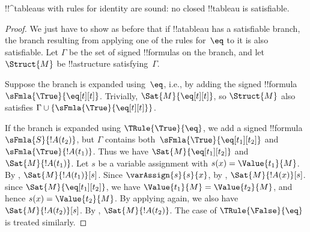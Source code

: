 \documentclass[../../../include/open-logic-section]{subfiles}
\begin{document}


\begin{prop}
!!^{tableau}s with rules for identity are sound: no closed !!{tableau}
  is satisfiable.
\end{prop}

\begin{proof}
We just have to show as before that if !!a{tableau} has a satisfiable
branch, the branch resulting from applying one of the rules for~$\eq$
to it is also satisfiable. Let $\Gamma$ be the set of signed
!!{formula}s on the branch, and let $\Struct{M}$ be !!a{structure}
satisfying~$\Gamma$.

Suppose the branch is expanded using~$\eq$, i.e., by adding the signed
!!{formula}~$\sFmla{\True}{\eq[t][t]}$. Trivially,
$\Sat{M}{\eq[t][t]}$, so $\Struct{M}$ also satisfies $\Gamma \cup
\{\sFmla{\True}{\eq[t][t]}\}$.

If the branch is expanded using $\TRule{\True}{\eq}$, we add a signed
!!{formula}~$\sFmla{S}{!A(t_2)}$, but $\Gamma$ contains
both~$\sFmla{\True}{\eq[t_1][t_2]}$ and $\sFmla{\True}{!A(t_1)}$. Thus
we have $\Sat{M}{\eq[t_1][t_2]}$ and $\Sat{M}{!A(t_1)}$. Let $s$ be a
variable assignment with $s(x) = \Value{t_1}{M}$.  By
, $\Sat{M}{!A(t_1)}[s]$. Since
$\varAssign{s}{s}{x}$, by ,
$\Sat{M}{!A(x)}[s]$. since $\Sat{M}{\eq[t_1][t_2]}$, we have
$\Value{t_1}{M} = \Value{t_2}{M}$, and hence $s(x) = \Value{t_2}{M}$.
By applying  again, we also have
$\Sat{M}{!A(t_2)}[s]$.  By ,
$\Sat{M}{!A(t_2)}$. The case of $\TRule{\False}{\eq}$ is treated
similarly.
\end{proof}
\end{document}
